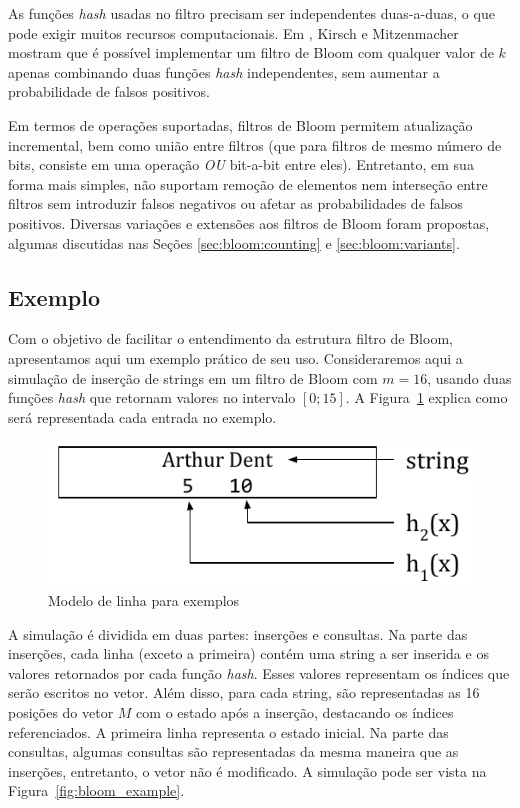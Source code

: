 As funções \emph{hash} usadas no filtro precisam ser independentes duas-a-duas, o que pode exigir muitos recursos computacionais. Em \cite{kirsch2006less}, Kirsch e Mitzenmacher mostram que é possível implementar um filtro de Bloom com qualquer valor de $k$ apenas combinando duas funções \emph{hash} independentes, sem aumentar a probabilidade de falsos positivos.

Em termos de operações suportadas, filtros de Bloom permitem atualização incremental, bem como união entre filtros (que para filtros de mesmo número de bits, consiste em uma operação \emph{OU} bit-a-bit entre eles). Entretanto, em sua forma mais simples, não suportam remoção de elementos nem interseção entre filtros sem introduzir falsos negativos ou afetar as probabilidades de falsos positivos. Diversas variações e extensões aos filtros de Bloom foram propostas, algumas discutidas nas Seções \ref{sec:bloom:counting} e \ref{sec:bloom:variants}.

\subsection{Exemplo}\label{sec:bloom:example}

Com o objetivo de facilitar o entendimento da estrutura filtro de Bloom, apresentamos aqui um exemplo prático de seu uso. Consideraremos aqui a simulação de inserção de strings em um filtro de Bloom com $m = 16$, usando duas funções \emph{hash} que retornam valores no intervalo $[0;15]$. A Figura~\ref{fig:bloom_example_legend} explica como será representada cada entrada no exemplo.

\begin{figure}[!htbp]
  \centering
  \includegraphics[scale=0.6]{figures/bloom_example_legend.pdf}
  \caption{Modelo de linha para exemplos}
  \label{fig:bloom_example_legend}
\end{figure}

A simulação é dividida em duas partes: inserções e consultas. Na parte das inserções, cada linha (exceto a primeira) contém uma string a ser inserida e os valores retornados por cada função \emph{hash}. Esses valores representam os índices que serão escritos no vetor. Além disso, para cada string, são representadas as 16 posições do vetor $M$ com o estado após a inserção, destacando os índices referenciados. A primeira linha representa o estado inicial. Na parte das consultas, algumas consultas são representadas da mesma maneira que as inserções, entretanto, o vetor não é modificado. A simulação pode ser vista na Figura~\ref{fig:bloom_example}.

